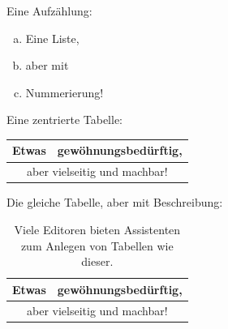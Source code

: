 Eine Aufzählung:
\begin{enumerate}[(a)]
  \item Eine Liste,
  \item aber mit
  \item Nummerierung!
\end{enumerate}

Eine zentrierte Tabelle:
\begin{center}
  \begin{tabular}{|c|c|} \hline
         Etwas         &  gewöhnungsbedürftig,         \\ \hline
    \multicolumn{2}{|c|}{aber vielseitig und machbar!} \\ \hline
  \end{tabular}
\end{center}

Die gleiche Tabelle, aber mit Beschreibung:
\begin{table}[h]
  \begin{center}
    \begin{tabular}{|c|c|} \hline
      Etwas         &  gewöhnungsbedürftig,        \\ \hline
      \multicolumn{2}{|c|}{aber vielseitig und machbar!} \\ \hline
    \end{tabular}
  \end{center}
  \caption{Viele Editoren bieten Assistenten zum Anlegen von Tabellen wie dieser.}
\end{table}

